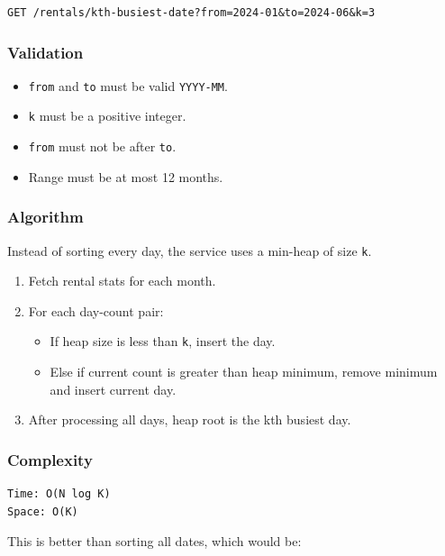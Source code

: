 \documentclass[11pt,a4paper]{article}
\begin{document}
\begin{lstlisting}
GET /rentals/kth-busiest-date?from=2024-01&to=2024-06&k=3
\end{lstlisting}

\subsubsection*{Validation}

\begin{itemize}
  \item \texttt{from} and \texttt{to} must be valid \texttt{YYYY-MM}.
  \item \texttt{k} must be a positive integer.
  \item \texttt{from} must not be after \texttt{to}.
  \item Range must be at most 12 months.
\end{itemize}

\subsubsection*{Algorithm}

Instead of sorting every day, the service uses a min-heap of size \texttt{k}.

\begin{enumerate}
  \item Fetch rental stats for each month.
  \item For each day-count pair:
  \begin{itemize}
    \item If heap size is less than \texttt{k}, insert the day.
    \item Else if current count is greater than heap minimum, remove minimum and insert current day.
  \end{itemize}
  \item After processing all days, heap root is the kth busiest day.
\end{enumerate}

\subsubsection*{Complexity}

\begin{lstlisting}
Time: O(N log K)
Space: O(K)
\end{lstlisting}

This is better than sorting all dates, which would be:
\end{document}
